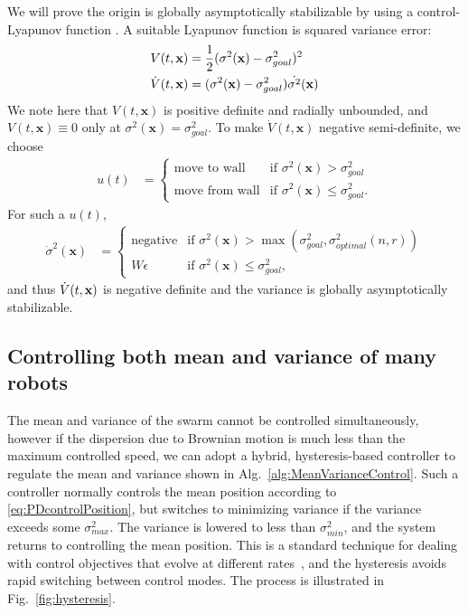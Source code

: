 We will prove the origin is globally asymptotically stabilizable by using a control-Lyapunov function \cite{Lyapunov1992}.  A suitable Lyapunov function is squared variance error:
\begin{align}
\label{eq:LyapunovVariance}
V(t,\bf{x})  &= \frac{1}{2} (\sigma^2(\mathbf{x}) - \sigma^2_{goal})^2\nonumber\\
\dot{V}(t,\bf{x}) &= (\sigma^2(\mathbf{x})-\sigma^2_{goal})\dot{\sigma^2}(\mathbf{x})
\end{align}
We note here that $V(t,\mathbf{x})$ is positive definite and radially unbounded, and $V(t,\mathbf{x}) \equiv 0$ only at $\sigma^2(\mathbf{x}) = \sigma^2_{goal}$.
To make $\dot{V}(t,\mathbf{x})$ negative semi-definite, we choose
\begin{align}
u(t) &=   \begin{cases}
	 \mbox{move to wall} &\mbox{if } \sigma^2(\mathbf{x})>\sigma^2_{goal} \\ 
	 \mbox{move from wall} & \mbox{if } \sigma^2(\mathbf{x}) \le \sigma^2_{goal}.
\end{cases} 
\end{align}
 For such a $u(t)$,
 \begin{align}
\dot{\sigma}^2(\mathbf{x}) &=   \begin{cases}
	 \mbox{negative} &\mbox{if } \sigma^2(\mathbf{x})> \max(\sigma^2_{goal}, \sigma^2_{optimal}(n,r))  \\ 
	 W \epsilon & \mbox{if } \sigma^2(\mathbf{x}) \le \sigma^2_{goal},
\end{cases} 
\end{align} and thus
$\dot{V}(t,{\bf x})$ is negative definite and the variance is globally asymptotically stabilizable.%





\subsection{Controlling both mean and variance of many robots}

The mean and variance of the swarm cannot be controlled simultaneously, however if the dispersion due to Brownian motion is much less than the maximum controlled speed, we can adopt a hybrid, hysteresis-based controller to regulate the mean and variance shown in Alg.~\ref{alg:MeanVarianceControl}.  Such a controller normally controls the mean position according to \eqref{eq:PDcontrolPosition}, but switches to minimizing variance if the variance exceeds some $\sigma_{max}^2$.  The variance is lowered to less than $\sigma_{min}^2$, and the system returns to controlling the mean position. This is a standard technique for dealing with control objectives that evolve at different rates~\cite{Sadraddini2015,kloetzer2007temporal}, and the hysteresis avoids rapid switching between control modes. The process is illustrated in Fig.~\ref{fig:hysteresis}. 


